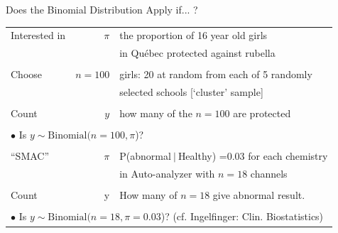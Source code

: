 \documentclass[handout]{beamer}\usepackage[]{graphicx}\usepackage[]{color}
\begin{document}
\begin{frame}{Does the Binomial Distribution Apply if... ?}

\small
\begin{tabular}{lrl}
	\hline
	Interested in & $\pi$      &  the proportion of 16 year old girls  \\
	&              &   in Qu\'{e}bec protected against rubella \\
	& & \\
	Choose        & $n=100$ & girls: 20 at random from each of 5 randomly \\
	&                &selected schools [`cluster' sample] \\
	& & \\
	Count & $y$ & how many of the $n=100$  are protected \\
	& & \\
	
	\multicolumn{3}{l}{$\bullet$ Is $y \sim \textrm{Binomial}(n = 100, \pi $)? } \\
	\hline
	& & \\
	``SMAC'' & $\pi$      &   P(abnormal$\:|\:$Healthy) =0.03 for each chemistry \\
	& &                       in Auto-analyzer with $n=18$ channels  \\
	&         &  \\
	Count            & y$ $&  How many of $n=18$  give abnormal result.  \\
	& & \\
	\multicolumn{3}{l}{$\bullet$ Is $y \sim \textrm{Binomial}(n = 18, \pi =0.03$)? (cf. Ingelfinger: Clin. Biostatistics) } 
\end{tabular}
\end{frame}
\end{document}

